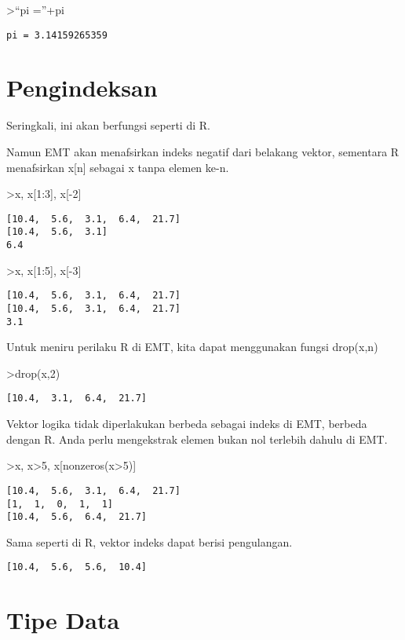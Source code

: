 \documentclass[
]{book}
\begin{document}
\textgreater{}``pi =''+pi

\begin{verbatim}
pi = 3.14159265359
\end{verbatim}

\chapter{Pengindeksan}\label{pengindeksan}

Seringkali, ini akan berfungsi seperti di R.

Namun EMT akan menafsirkan indeks negatif dari belakang vektor, sementara R menafsirkan x{[}n{]} sebagai x tanpa elemen ke-n.

\textgreater x, x{[}1:3{]}, x{[}-2{]}

\begin{verbatim}
[10.4,  5.6,  3.1,  6.4,  21.7]
[10.4,  5.6,  3.1]
6.4
\end{verbatim}

\textgreater x, x{[}1:5{]}, x{[}-3{]}

\begin{verbatim}
[10.4,  5.6,  3.1,  6.4,  21.7]
[10.4,  5.6,  3.1,  6.4,  21.7]
3.1
\end{verbatim}

Untuk meniru perilaku R di EMT, kita dapat menggunakan fungsi drop(x,n)

\textgreater drop(x,2)

\begin{verbatim}
[10.4,  3.1,  6.4,  21.7]
\end{verbatim}

Vektor logika tidak diperlakukan berbeda sebagai indeks di EMT, berbeda dengan R. Anda perlu mengekstrak elemen bukan nol terlebih dahulu di EMT.

\textgreater x, x\textgreater5, x{[}nonzeros(x\textgreater5){]}

\begin{verbatim}
[10.4,  5.6,  3.1,  6.4,  21.7]
[1,  1,  0,  1,  1]
[10.4,  5.6,  6.4,  21.7]
\end{verbatim}

Sama seperti di R, vektor indeks dapat berisi pengulangan.

\begin{verbatim}
[10.4,  5.6,  5.6,  10.4]
\end{verbatim}

\chapter{Tipe Data}\label{tipe-data}
\end{document}
